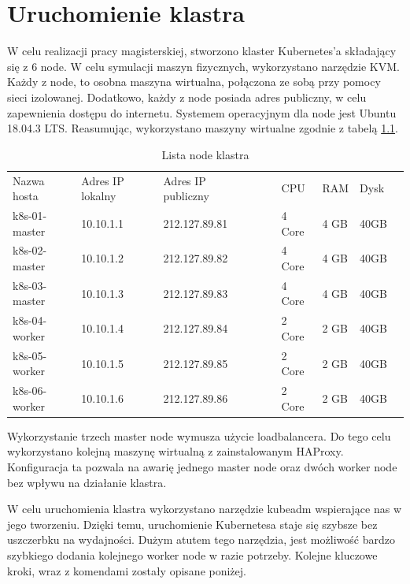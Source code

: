 \documentclass[pl,final,oneside]{mgr} %
\begin{document}
\chapter{Uruchomienie klastra}
W celu realizacji pracy magisterskiej, stworzono klaster Kubernetes’a składający się z 6 node. W celu symulacji maszyn fizycznych, wykorzystano narzędzie KVM. Każdy z node, to osobna maszyna wirtualna,  połączona ze sobą przy pomocy sieci izolowanej. Dodatkowo, każdy z node posiada adres publiczny, w celu zapewnienia dostępu do internetu. Systemem operacyjnym dla node jest Ubuntu 18.04.3 LTS. Reasumując, wykorzystano maszyny wirtualne zgodnie z tabelą \ref{tab:kvm_node}.

\begin{table}[h!]
	\begin{tabular}{lllllllll}
		Nazwa hosta   & Adres IP lokalny & Adres IP publiczny &  &  & CPU    & RAM  & Dysk &  \\
		k8s-01-master & 10.10.1.1        & 212.127.89.81     &  &  & 4 Core & 4 GB & 40GB &  \\
		k8s-02-master & 10.10.1.2        & 212.127.89.82     &  &  & 4 Core & 4 GB & 40GB &  \\
		k8s-03-master & 10.10.1.3        & 212.127.89.83     &  &  & 4 Core & 4 GB & 40GB &  \\
		k8s-04-worker & 10.10.1.4        & 212.127.89.84     &  &  & 2 Core & 2 GB & 40GB &  \\
		k8s-05-worker & 10.10.1.5        & 212.127.89.85     &  &  & 2 Core & 2 GB & 40GB &  \\
		k8s-06-worker & 10.10.1.6        & 212.127.89.86     &  &  & 2 Core & 2 GB & 40GB & 
	\end{tabular}
	\label{tab:kvm_node}
	\caption{Lista node klastra}
\end{table}
Wykorzystanie trzech master node wymusza użycie loadbalancera. Do tego celu wykorzystano kolejną maszynę wirtualną z zainstalowanym HAProxy. Konfiguracja ta pozwala na awarię jednego master node oraz dwóch worker node bez wpływu na działanie klastra.

W celu uruchomienia klastra wykorzystano narzędzie kubeadm wspierające nas w jego tworzeniu. Dzięki temu, uruchomienie Kubernetesa staje się szybsze bez uszczerbku na wydajności. Dużym atutem tego narzędzia, jest możliwość bardzo szybkiego dodania kolejnego worker node w razie potrzeby. Kolejne kluczowe kroki, wraz z komendami zostały opisane poniżej.
\end{document}
